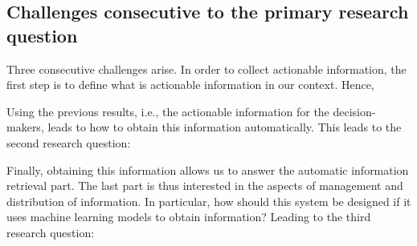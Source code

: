 \subsection{Challenges consecutive to the primary research question}
Three consecutive challenges arise.
In order to collect actionable information, the first step is to define what is actionable information in our context.
Hence,

\begin{center}
\end{center}

Using the previous results, i.e., the actionable information for the decision-makers, leads to how to obtain this information automatically.
This leads to the second research question:

\begin{center}
\end{center}

Finally, obtaining this information allows us to answer the automatic information retrieval part.
The last part is thus interested in the aspects of management and distribution of information.
In particular, how should this system be designed if it uses machine learning models to obtain information?
Leading to the third research question:

\begin{center}
\end{center}

